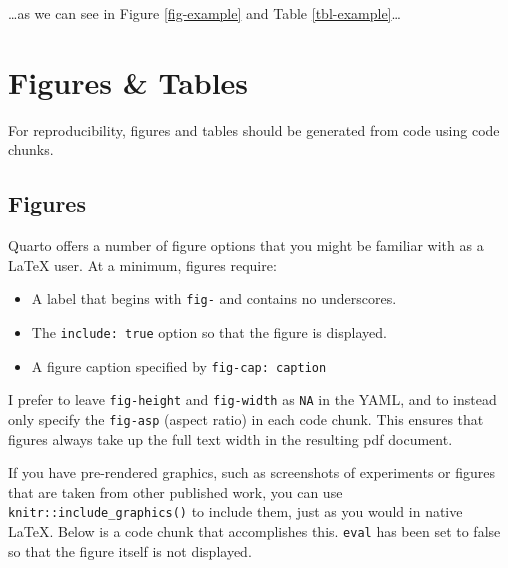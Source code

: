 \documentclass[../main.tex]{subfiles}
\begin{document}
\ldots as we can see in Figure \ref{fig-example} and Table
\ref{tbl-example}\ldots{}

\section{Figures \& Tables}\label{figures-tables}

For reproducibility, figures and tables should be generated from code
using code chunks.

\subsection{Figures}\label{figures}

Quarto offers a number of figure options that you might be familiar with
as a LaTeX user. At a minimum, figures require:

\begin{itemize}
\tightlist
\item
  A label that begins with \texttt{fig-} and contains no underscores.
\item
  The \texttt{include:\ true} option so that the figure is displayed.
\item
  A figure caption specified by \texttt{fig-cap:\ caption}
\end{itemize}

I prefer to leave \texttt{fig-height} and \texttt{fig-width} as
\texttt{NA} in the YAML, and to instead only specify the
\texttt{fig-asp} (aspect ratio) in each code chunk. This ensures that
figures always take up the full text width in the resulting pdf
document.

If you have pre-rendered graphics, such as screenshots of experiments or
figures that are taken from other published work, you can use
\texttt{knitr::include\_graphics()} to include them, just as you would
in native LaTeX. Below is a code chunk that accomplishes this.
\texttt{eval} has been set to false so that the figure itself is not
displayed.

\begin{Shaded}
\begin{Highlighting}[]
\SpecialCharTok{::}\NormalTok{(} \NormalTok{, } \NormalTok{)}
\end{Highlighting}
\end{Shaded}
\end{document}
